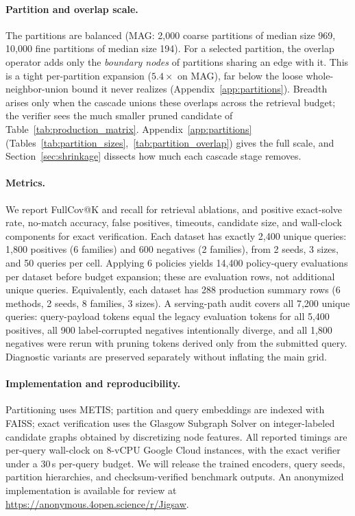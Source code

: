 \documentclass{article}
\begin{document}
\paragraph{Partition and overlap scale.}
The partitions are balanced (MAG: 2{,}000 coarse partitions of median size 969, 10{,}000 fine partitions of median size 194). For a selected partition, the overlap operator adds only the \emph{boundary nodes} of partitions sharing an edge with it. This is a tight per-partition expansion ($5.4\times$ on MAG), far below the loose whole-neighbor-union bound it never realizes (Appendix~\ref{app:partitions}). Breadth arises only when the cascade unions these overlaps across the retrieval budget; the verifier sees the much smaller pruned candidate of Table~\ref{tab:production_matrix}. Appendix~\ref{app:partitions} (Tables~\ref{tab:partition_sizes},~\ref{tab:partition_overlap}) gives the full scale, and Section~\ref{sec:shrinkage} dissects how much each cascade stage removes.

\paragraph{Metrics.}
We report FullCov@K and recall for retrieval ablations, and positive exact-solve rate, no-match accuracy, false positives, timeouts, candidate size, and wall-clock components for exact verification. Each dataset has exactly 2,400 unique queries: 1,800 positives (6 families) and 600 negatives (2 families), from 2 seeds, 3 sizes, and 50 queries per cell. Applying 6 policies yields 14,400 policy-query evaluations per dataset before budget expansion; these are evaluation rows, not additional unique queries. Equivalently, each dataset has 288 production summary rows (6 methods, 2 seeds, 8 families, 3 sizes). A serving-path audit covers all 7,200 unique queries: query-payload tokens equal the legacy evaluation tokens for all 5,400 positives, all 900 label-corrupted negatives intentionally diverge, and all 1,800 negatives were rerun with pruning tokens derived only from the submitted query. Diagnostic variants are preserved separately without inflating the main grid.

\paragraph{Implementation and reproducibility.} Partitioning uses METIS; partition and query embeddings are indexed with FAISS; exact verification uses the Glasgow Subgraph Solver on integer-labeled candidate graphs obtained by discretizing node features. All reported timings are per-query wall-clock on 8-vCPU Google Cloud instances, with the exact verifier under a $30$\,s per-query budget. We will release the trained encoders, query seeds, partition hierarchies, and checksum-verified benchmark outputs. An anonymized implementation is available for review at \url{https://anonymous.4open.science/r/Jigsaw}.
\end{document}
